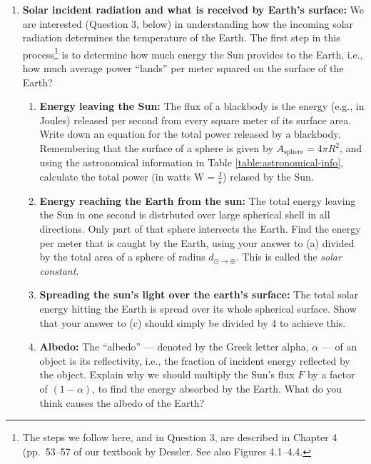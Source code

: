 \documentclass[12pt]{article}
\begin{document}
\begin{enumerate}
\item {\bf Solar incident radiation and what is received by Earth's surface:}  We are interested (Question 3, below) in understanding how the incoming solar radiation determines the temperature of the Earth.  The first step in this process\footnote{The steps we follow here, and in Question 3, are described in Chapter 4 (pp.\ 53--57 of our textbook by Dessler.  See also Figures 4.1--4.4.} is to determine how much energy the Sun provides to the Earth, i.e., how much average power ``lands'' per meter squared on the surface of the Earth?  
	\begin{enumerate}
	\item {\bf Energy leaving the Sun:} The flux of a blackbody is the energy (e.g., in Joules) released per second from every square meter of its surface area.  Write down an equation for the total power released by a blackbody. Remembering that the surface of a sphere is given by $A_\text{sphere} = 4 \pi R^2$, and using the astronomical information in Table \ref{table:astronomical-info}, calculate the total power (in watts $\text{W} = \frac{\text{J}}{\text{s}}$) relased by the Sun.
	\item {\bf Energy reaching the Earth from the sun:}   The total energy leaving the Sun in one second is distrbuted over  large spherical shell in all directions.  Only part of that sphere intersects the Earth.  Find the energy per meter that is caught by the Earth, using your answer to (a) divided by the total area of a sphere of radius $d_{\odot \rightarrow \oplus}$.   This is called the {\em solar constant}.
	\item {\bf Spreading the sun's light over the earth's surface:}  The total solar energy hitting the Earth is spread over its whole spherical surface.  Show that your answer to (c) should simply be divided by 4 to achieve this.
	\item {\bf Albedo:}  The ``albedo'' --- denoted by the Greek letter alpha, $\alpha$ --- of an object is its reflectivity, i.e., the fraction of incident energy reflected by the object.  Explain why we should multiply the Sun's flux $F$ by a factor of $(1 - \alpha)$, to find the energy absorbed by the Earth.  What do you think causes the albedo of the Earth?
	\end{enumerate}


\end{enumerate}
\end{document}
